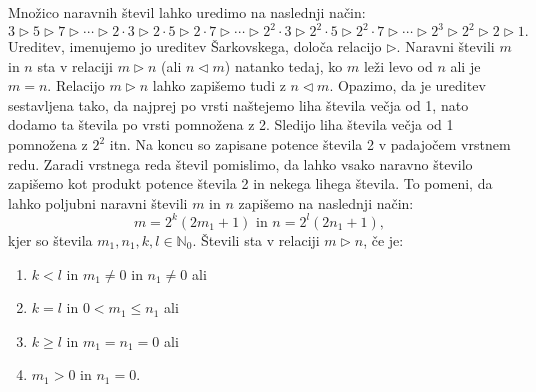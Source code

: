 \documentclass[mat2]{fmfdelo}
\newcommand{\N}{\mathbb N}
\begin{document}
\begin{definicija}
Množico naravnih števil lahko uredimo na naslednji način:
$$3 \triangleright 5 \triangleright 7 \triangleright \cdots \triangleright 2\cdot 3 \triangleright 2\cdot 5 \triangleright 2\cdot 7 \triangleright \cdots \triangleright 2^2\cdot 3 \triangleright 2^2\cdot 5 \triangleright 2^2\cdot 7 \triangleright \cdots \triangleright 2^3 \triangleright 2^2 \triangleright 2 \triangleright 1.$$
Ureditev, imenujemo jo ureditev Šarkovskega, določa relacijo $\triangleright$. Naravni števili $m$ in $n$ sta v relaciji $m\triangleright n$ (ali $n \triangleleft m$) natanko tedaj, ko $m$ leži levo od $n$ ali je $m=n$. Relacijo $m \triangleright n$ lahko zapišemo tudi z $n \triangleleft m$. Opazimo, da je ureditev sestavljena tako, da najprej po vrsti naštejemo liha števila večja od 1, nato dodamo ta števila po vrsti pomnožena z 2. Sledijo liha števila večja od 1 pomnožena z $2^2$ itn. Na koncu so zapisane potence števila 2 v padajočem vrstnem redu. Zaradi vrstnega reda števil pomislimo, da lahko vsako naravno število zapišemo kot produkt potence števila 2 in nekega lihega števila. To pomeni, da lahko poljubni naravni števili $m$ in $n$ zapišemo na naslednji način: 
\begin{equation}
m= 2^k(2m_1 +1)\text{ in } n= 2^l(2n_1 +1), \label{eq:zapis}
\end{equation}
 kjer so števila $m_1, n_1, k, l \in \N_0$. Števili sta v relaciji $m \triangleright n$, če je:
\begin{enumerate}[label={(R\arabic*)}]
\item $k<l$ in $m_1 \neq 0$ in $n_1 \neq 0$ ali \label{rel1}
\item $k=l$ in $0<m_1 \leq n_1$ ali \label{rel2}
\item $k \geq l$ in $m_1 = n_1=0$ ali \label{rel3}
\item $m_1>0$ in $n_1 =0$. \label{rel4}
\end{enumerate}
\end{definicija}
\end{document}
